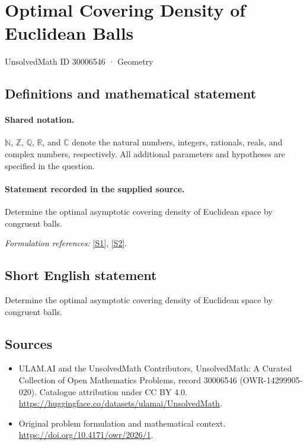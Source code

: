 \documentclass[11pt]{article}
\newcommand{\sref}[2]{\hyperlink{source:#1:#2}{[S#2]}}
\begin{document}
\setcounter{section}{30006545}
\section{Optimal Covering Density of Euclidean Balls}\label{30006546}
{\small UnsolvedMath ID 30006546 · Geometry}
\subsection{Definitions and mathematical statement}

\paragraph{Shared notation.}$\mathbb N$, $\mathbb Z$, $\mathbb Q$, $\mathbb R$, and $\mathbb C$ denote the natural numbers, integers, rationals, reals, and complex numbers, respectively. All additional parameters and hypotheses are specified in the question.


\paragraph{Statement recorded in the supplied source.}
Determine the optimal asymptotic covering density of Euclidean space by congruent balls.
\par\smallskip\textit{Formulation references:} \sref{30006546}{1}, \sref{30006546}{2}.
\subsection{Short English statement}
Determine the optimal asymptotic covering density of Euclidean space by congruent balls.
\subsection{Sources}
\begin{itemize}
\item[\hypertarget{source:30006546:1}{S1}] ULAM.AI and the UnsolvedMath Contributors, UnsolvedMath: A Curated Collection of Open Mathematics Problems, record 30006546 (OWR-14299905-020). Catalogue attribution under CC BY 4.0.
\url{https://huggingface.co/datasets/ulamai/UnsolvedMath}.
\item[\hypertarget{source:30006546:2}{S2}] Original problem formulation and mathematical context.
\url{https://doi.org/10.4171/owr/2026/1}.
\end{itemize}
\label{end:30006546}
\end{document}
